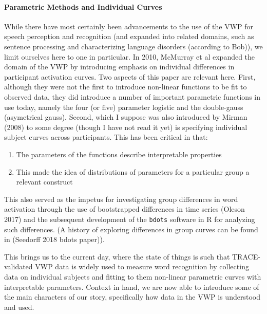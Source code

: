 \documentclass{article}
\newcommand{\xt}{\texttt}%
\begin{document}
\paragraph{Parametric Methods and Individual Curves} While there have most certainly been advancements to the use of the VWP for speech perception and recognition (and expanded into related domains, such as sentence processing and characterizing language disorders (according to Bob)), we  limit ourselves here to one in particular. In 2010, McMurray et al expanded the domain of the VWP by introducing emphasis on individual differences in participant activation curves. Two aspects of this paper are relevant here. First, although they were not the first to introduce non-linear functions to be fit to observed data, they did introduce a number of important parametric functions in use today, namely the four (or five) parameter logistic and the double-gauss (asymetrical gauss). Second, which I suppose was also introduced by Mirman (2008) to some degree (though I have not read it yet) is specifying individual subject curves across participants. This has been critical in that:

\begin{singlespace}
\begin{enumerate}
\vspace{-3mm}
\item The parameters of the functions describe interpretable properties
\item This made the idea of distributions of parameters for a particular group a relevant construct
\end{enumerate}
\end{singlespace}

This also served as the impetus for investigating group differences in word activation through the use of bootstrapped differences in time series (Oleson 2017) and the subsequent development of the \xt{bdots} software in R for analyzing such differences. (A history of exploring differences in group curves can be found in (Seedorff 2018 bdots paper)).

This brings us to the current day, where the state of things is such that TRACE-validated VWP data is widely used to measure word recognition by collecting data on individual subjects and fitting to them non-linear parametric curves with interpretable parameters. Context in hand, we are now able to introduce some of the main characters of our story, specifically how data in the VWP is understood and used. 
\end{document}
